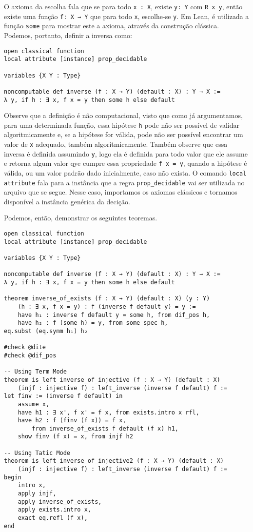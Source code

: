 O axioma da escolha fala que se para todo \lstinline{x : X}, existe \lstinline{y: Y} com 
\lstinline{R x y}, então existe uma função \lstinline{f: X → Y} que para todo \lstinline{x},
escolhe-se \lstinline{y}. Em Lean, é utilizada a função \lstinline{some} para mostrar este a 
axioma, através da construção clássica. Podemos, portanto, definir a inversa como: 

\begin{lstlisting}
open classical function
local attribute [instance] prop_decidable

variables {X Y : Type}

noncomputable def inverse (f : X → Y) (default : X) : Y → X :=
λ y, if h : ∃ x, f x = y then some h else default   
\end{lstlisting}

Observe que a definição é não computacional, visto que como já argumentamos, para uma determinada função, essa 
hipótese \lstinline{h} pode não ser possível de validar algoritmicamente e, se a hipótese for válida, pode não 
ser possível encontrar um valor de \lstinline{x} adequado, também algoritmicamente. Também observe que essa inversa é 
definida assumindo \lstinline{y}, logo ela é definida para todo valor que ele assume e retorna algum valor qye cumpre 
essa propriedade \lstinline{f x = y}, quando a hipótese é válida, ou um valor padrão dado inicialmente, caso não exista. 
O comando \lstinline{local attribute} fala para a instância que a regra \lstinline{prop_decidable} vai ser utilizada no 
arquivo que se segue. Nesse caso, importamos os axiomas clássicos e tornamos disponível a instância genérica da decição.   

Podemos, então, demonstrar os seguintes teoremas. 

\begin{lstlisting}
open classical function
local attribute [instance] prop_decidable

variables {X Y : Type}

noncomputable def inverse (f : X → Y) (default : X) : Y → X :=
λ y, if h : ∃ x, f x = y then some h else default

theorem inverse_of_exists (f : X → Y) (default : X) (y : Y)
    (h : ∃ x, f x = y) : f (inverse f default y) = y :=
    have h₁ : inverse f default y = some h, from dif_pos h,
    have h₂ : f (some h) = y, from some_spec h,
eq.subst (eq.symm h₁) h₂

#check @dite
#check @dif_pos 

-- Using Term Mode 
theorem is_left_inverse_of_injective (f : X → Y) (default : X)
    (injf : injective f) : left_inverse (inverse f default) f :=
let finv := (inverse f default) in
    assume x,
    have h1 : ∃ x', f x' = f x, from exists.intro x rfl,
    have h2 : f (finv (f x)) = f x, 
        from inverse_of_exists f default (f x) h1,
    show finv (f x) = x, from injf h2

-- Using Tatic Mode 
theorem is_left_inverse_of_injective2 (f : X → Y) (default : X)
    (injf : injective f) : left_inverse (inverse f default) f :=
begin 
    intro x,
    apply injf, 
    apply inverse_of_exists,
    apply exists.intro x,
    exact eq.refl (f x), 
end
\end{lstlisting}

